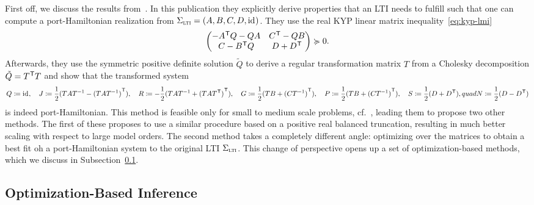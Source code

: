 First off, we discuss the results from~\cite{Beattie2022}.
In this publication they explicitly derive properties that an \ac{LTI} needs to fulfill such that one can compute a port-Hamiltonian realization from $\Sigma_{\textnormal{\scshape lti}} = (A, B, C, D, \text{id}_{})$.
They use the real KYP linear matrix inequality~\eqref{eq:kyp-lmi}
\begin{equation*}
    \begin{pmatrix}
        - A^{\mkern1mu \mathsf{T}} Q - Q A & C^{\mkern1mu \mathsf{T}} - QB \\
        C - B^{\mkern1mu \mathsf{T}} Q & D + D^{\mkern1mu \mathsf{T}}
    \end{pmatrix} \succcurlyeq 0.
\end{equation*}
Afterwards, they use the symmetric positive definite solution $\tilde{Q}$ to derive a regular transformation matrix $T$ from a Cholesky decomposition $\tilde{Q} = T^{\mkern1mu \mathsf{T}} T$ and show that the transformed system
\begin{equation}\label{eq:ph-transformation-from-passive-system}
    Q \coloneqq \text{id}_{},\quad J \coloneqq \frac{1}{2} (T A T^{-1} - {(T A T^{-1})}^{\mkern1mu \mathsf{T}}),\quad R \coloneqq -\frac{1}{2} (T A T^{-1} + {(T A T^{\mkern1mu \mathsf{T}})}^{\mkern1mu \mathsf{T}}),\quad G \coloneqq \frac{1}{2} (T B + {(C T^{-1})}^{\mkern1mu \mathsf{T}}),\quad P \coloneqq \frac{1}{2} (T B + {(C T^{-1})}^{\mkern1mu \mathsf{T}}),\quad S \coloneqq \frac{1}{2} (D + D^{\mkern1mu \mathsf{T}}),quad N \coloneqq \frac{1}{2} (D - D^{\mkern1mu \mathsf{T}})
\end{equation}
is indeed port-Hamiltonian.
This method is feasible only for small to medium scale problems, cf.~\cite{Cherifi2019}, leading them to propose two other methods.
The first of these proposes to use a similar procedure based on a positive real balanced truncation, resulting in much better scaling with respect to large model orders.
The second method takes a completely different angle: optimizing over the matrices to obtain a best fit oh a port-Hamiltonian system to the original \ac{LTI} $\Sigma_{\textnormal{\scshape lti}}$.
This change of perspective opens up a set of optimization-based methods, which we discuss in Subsection~\ref{subsec:optimization-based-inference}.


\subsection{Optimization-Based Inference}\label{subsec:optimization-based-inference}

